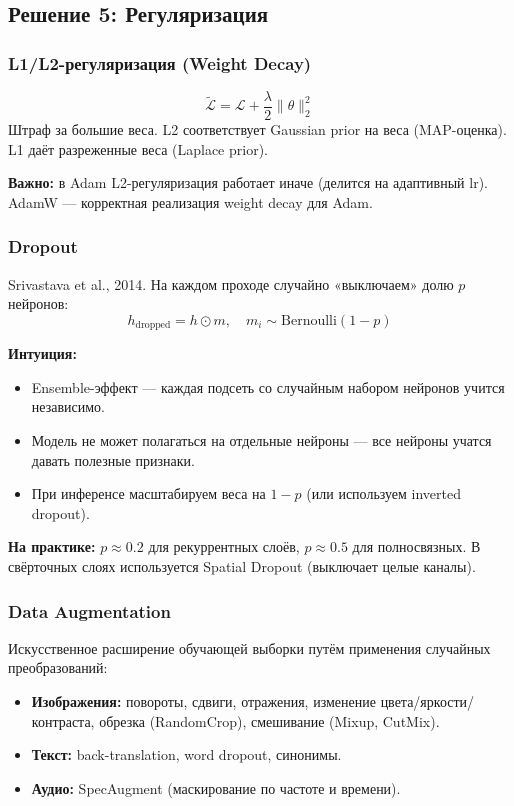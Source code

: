 \documentclass[a4paper,12pt]{article}
\begin{document}
\subsection{Решение 5: Регуляризация}

\subsubsection{L1/L2-регуляризация (Weight Decay)}
\[
\tilde{\mathcal{L}} = \mathcal{L} + \frac{\lambda}{2} \|\theta\|_2^2
\]
Штраф за большие веса. L2 соответствует Gaussian prior на веса (MAP-оценка). L1 даёт разреженные веса (Laplace prior).

\textbf{Важно:} в Adam L2-регуляризация работает иначе (делится на адаптивный lr). AdamW — корректная реализация weight decay для Adam.

\subsubsection{Dropout}
Srivastava et al., 2014. На каждом проходе случайно «выключаем» долю $p$ нейронов:
\[
h_{\text{dropped}} = h \odot m, \quad m_i \sim \text{Bernoulli}(1-p)
\]

\textbf{Интуиция:}
\begin{itemize}
    \item Ensemble-эффект — каждая подсеть со случайным набором нейронов учится независимо.
    \item Модель не может полагаться на отдельные нейроны — все нейроны учатся давать полезные признаки.
    \item При инференсе масштабируем веса на $1-p$ (или используем inverted dropout).
\end{itemize}

\textbf{На практике:} $p \approx 0.2$ для рекуррентных слоёв, $p \approx 0.5$ для полносвязных. В свёрточных слоях используется Spatial Dropout (выключает целые каналы).

\subsubsection{Data Augmentation}
Искусственное расширение обучающей выборки путём применения случайных преобразований:
\begin{itemize}
    \item \textbf{Изображения:} повороты, сдвиги, отражения, изменение цвета/яркости/контраста, обрезка (RandomCrop), смешивание (Mixup, CutMix).
    \item \textbf{Текст:} back-translation, word dropout, синонимы.
    \item \textbf{Аудио:} SpecAugment (маскирование по частоте и времени).
\end{itemize}
\end{document}
